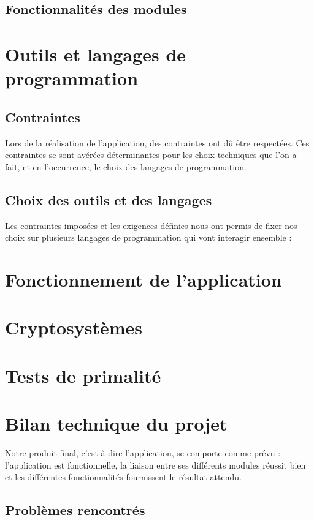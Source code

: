 		\subsection{Fonctionnalités des modules}
		
	\section{Outils et langages de programmation}
		\subsection{Contraintes}
		Lors de la réalisation de l'application, des contraintes ont dû être respectées.
		Ces contraintes se sont avérées déterminantes pour les choix techniques que l'on a fait, et en l'occurrence, le choix des langages de programmation. 
		
		\subsection{Choix des outils et des langages}
		Les contraintes imposées et les exigences définies nous ont permis de fixer nos choix sur plusieurs langages de programmation qui vont interagir ensemble :
	
	\section{Fonctionnement de l'application}
	
	\section{Cryptosystèmes}
	
	\section{Tests de primalité}

		
	\section{Bilan technique du projet}
		Notre produit final, c'est à dire l'application, se comporte comme prévu : l'application est fonctionnelle, la liaison entre ses différents modules réussit bien et les différentes fonctionnalités fournissent le résultat attendu.		

		\subsection{Problèmes rencontrés}
